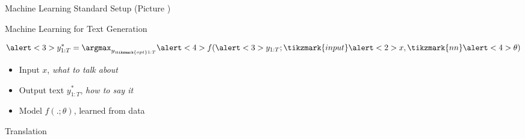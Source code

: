 


\begin{frame}{Machine Learning Standard Setup}
(Picture )
\end{frame}


\begin{frame}{Machine Learning for Text Generation}

  \[ \alert<3>{y^*_{1:T}} = \argmax_{y_{\tikzmark{opt}1:T}} \alert<4>{f}(\alert<3>{y_{1:T}}; \tikzmark{input}\alert<2>{x}, \tikzmark{nn}\alert<4>{\theta}) \]



  \begin{itemize}
    \pause
  \item Input \alert<2>{$x$},  \textit{what to talk about}
    \air
    \pause
  \item Output text \alert<3>{$y^*_{1:T}$}, \textit{how to say it}
    \air
    \pause
  \item Model \alert<4>{$f(.; \theta)$}, learned from data
  \end{itemize}
\end{frame}

\begin{frame}{Translation}

\end{frame}



